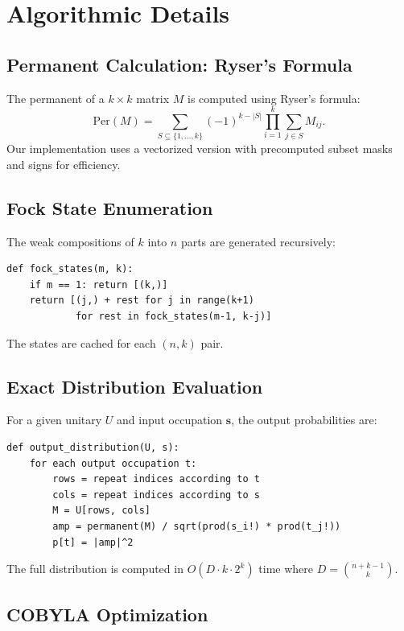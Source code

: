 \appendix
\section{Algorithmic Details}
\label{app:algorithms}

\subsection{Permanent Calculation: Ryser's Formula}

The permanent of a $k \times k$ matrix $M$ is computed using Ryser's formula:
\begin{equation}
\mathrm{Per}(M) = \sum_{S \subseteq \{1,\dots,k\}} (-1)^{k-|S|} \prod_{i=1}^k \sum_{j \in S} M_{ij}.
\end{equation}
Our implementation uses a vectorized version with precomputed subset masks and signs for efficiency.

\subsection{Fock State Enumeration}

The weak compositions of $k$ into $n$ parts are generated recursively:
\begin{verbatim}
def fock_states(m, k):
    if m == 1: return [(k,)]
    return [(j,) + rest for j in range(k+1) 
            for rest in fock_states(m-1, k-j)]
\end{verbatim}
The states are cached for each $(n,k)$ pair.

\subsection{Exact Distribution Evaluation}

For a given unitary $U$ and input occupation $\mathbf{s}$, the output probabilities are:
\begin{verbatim}
def output_distribution(U, s):
    for each output occupation t:
        rows = repeat indices according to t
        cols = repeat indices according to s
        M = U[rows, cols]
        amp = permanent(M) / sqrt(prod(s_i!) * prod(t_j!))
        p[t] = |amp|^2
\end{verbatim}
The full distribution is computed in $O(D \cdot k \cdot 2^k)$ time where $D = \binom{n+k-1}{k}$.

\subsection{COBYLA Optimization}

